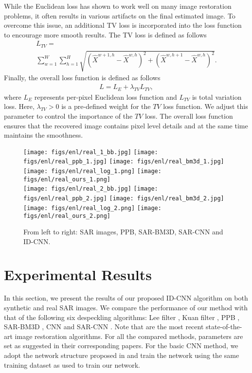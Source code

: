 \documentclass[journal]{IEEEtran}
\begin{document}
While the Euclidean loss has shown to work well on many image restoration problems, it often results in various artifacts on the final estimated image.  To overcome this issue, an additional TV loss is incorporated into the loss function to encourage more smooth results.  The TV loss is defined as follows
\begin{multline}
L_{TV} =\\
 \sum_{w=1}^{W}\sum_{h=1}^{H}\sqrt{(\hat{X}^{w+1,h}-\hat{X}^{w,h})^2+(\hat{X}^{w,h+1}-\hat{X}^{w,h})^2}.
\end{multline}
Finally, the overall loss function is defined as follows
\begin{align}
L = L_E + \lambda_{TV} L_{TV},
\label{eq:loss}
\end{align}
where $L_E$ represents per-pixel Euclidean loss function and $L_{TV}$ is total variation loss. Here, $\lambda_{TV}>0$ is a pre-defined weight for the $TV$ loss function.  We adjust this parameter to control the importance of the $TV$ loss.  The overall loss function ensures that the recovered image contains pixel level details and at the same time maintains the smoothness.  










\begin{figure*}[htp!]
 \centering
 \texttt{[image: figs/enl/real\_1\_bb.jpg]}
 \texttt{[image: figs/enl/real\_ppb\_1.jpg]}
\texttt{[image: figs/enl/real\_bm3d\_1.jpg]}
\texttt{[image: figs/enl/real\_log\_1.png]}
\texttt{[image: figs/enl/real\_ours\_1.png]}\\
\vspace{0.5em}
 \texttt{[image: figs/enl/real\_2\_bb.jpg]}
 \texttt{[image: figs/enl/real\_ppb\_2.jpg]}
\texttt{[image: figs/enl/real\_bm3d\_2.jpg]}
\texttt{[image: figs/enl/real\_log\_2.png]}
\texttt{[image: figs/enl/real\_ours\_2.png]}\\
 \caption{From left to right: SAR images, PPB, SAR-BM3D, SAR-CNN and ID-CNN.}
\label{fig:real}
\end{figure*}



\section{Experimental Results}\label{sec:results}
In  this  section,  we  present  the  results  of  our  proposed
ID-CNN algorithm on both synthetic and real SAR images.   We compare the performance of our method with that of the following six despeckling algorithms: Lee filter \cite{lee1981speckle}, Kuan filter \cite{kuan1985adaptive}, PPB \cite{ppb}, SAR-BM3D \cite{sarbm3d}, CNN \cite{cnn} and SAR-CNN \cite{sarcnn}.   Note that \cite{ppb, sarbm3d, cnn, sarcnn} are the most recent state-of-the-art image restoration algorithms.  For all the compared methods, parameters are set as suggested in their corresponding papers.  
For the basic CNN method, we adopt the network structure proposed in \cite{cnn} and train the  network using the same training dataset as used to train our network.   
\end{document}
